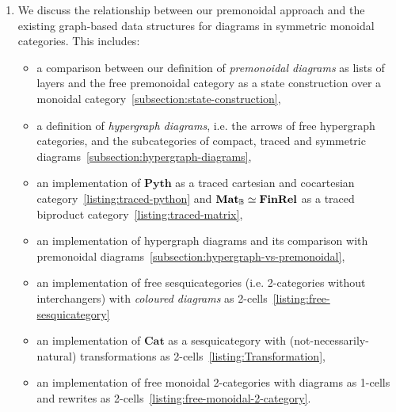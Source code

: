 \begin{enumerate}
\item We discuss the relationship between our premonoidal approach and the existing graph-based data structures for diagrams in symmetric monoidal categories.
This includes:
\begin{itemize}
\item a comparison between our definition of \emph{premonoidal diagrams} as lists of layers and the free premonoidal category as a state construction over a monoidal category~\ref{subsection:state-construction},
\item a definition of \emph{hypergraph diagrams}, i.e. the arrows of free hypergraph categories, and the subcategories of compact, traced and symmetric diagrams~\ref{subsection:hypergraph-diagrams},
\item an implementation of $\mathbf{Pyth}$ as a traced cartesian and cocartesian category~\ref{listing:traced-python} and $\mathbf{Mat}_{\mathbb{B}} \simeq \mathbf{FinRel}$ as a traced biproduct category~\ref{listing:traced-matrix},
\item an implementation of hypergraph diagrams and its comparison with premonoidal diagrams~\ref{subsection:hypergraph-vs-premonoidal},
\item an implementation of free sesquicategories (i.e. 2-categories without interchangers) with \emph{coloured diagrams} as 2-cells~\ref{listing:free-sesquicategory}
\item an implementation of $\mathbf{Cat}$ as a sesquicategory with (not-necessarily-natural) transformations as 2-cells~\ref{listing:Transformation},
\item an implementation of free monoidal 2-categories with diagrams as 1-cells and rewrites as 2-cells~\ref{listing:free-monoidal-2-category}.
\end{itemize}
\end{enumerate}

